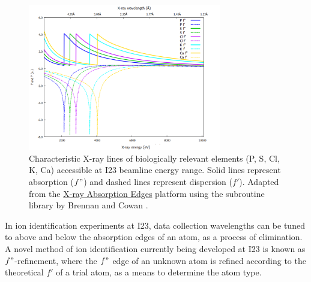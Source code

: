 \begin{figure}[h]
    \centering
    \includegraphics[width = 0.75\textwidth]{images/absorption lines high quality cropped.png}
    \caption{Characteristic X-ray lines of biologically relevant elements (P, S, Cl, K, Ca) accessible at I23 beamline energy range. Solid lines represent absorption ($f"$) and dashed lines represent dispersion ($f'$). Adapted from the \href{http://skuld.bmsc.washington.edu/scatter/AS_periodic.html}{X-ray Absorption Edges} platform using the subroutine library by Brennan and Cowan \cite{Brennan1992}.}%
    \label{Anomaluos scattering edges}
\end{figure}

In ion identification experiments at I23, data collection wavelengths can be tuned to above and below the absorption edges of an atom, as a process of elimination. %
A novel method of ion identification currently being developed at I23 is known as $f"$-refinement, where the $f"$ edge of an unknown atom is refined according to the theoretical $f'$ of a trial atom, as a means to determine the atom type. %

